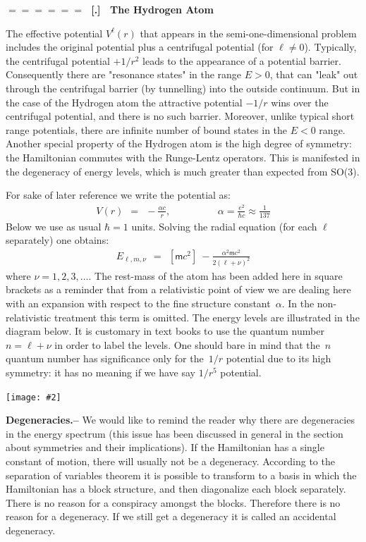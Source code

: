 \documentclass[onecolumn,fleqn]{revtex4}
\newcommand{\mass}{\mathsf{m}}
\newcommand{\putgraph}[2][0.30\hsize]{\texttt{[image: \#2]}}
\newcommand{\beq}{\begin{eqnarray}}
\newcommand{\eeq}{\end{eqnarray}}
\renewcommand{\thesubsection}{\arabic{subsection}}
\renewcommand{\thesubsubsection}{\arabic{subsubsection}}
\newcommand{\sheadC}[1]
{
\addtocounter{subsubsection}{1}
\vspace{5mm}
{\Large\bf $=\!=\!=\!=\!=\!=\;$ [\thesubsection.\thesubsubsection] \ #1}  
\nopagebreak
\phantomsection
}
\begin{document}
\sheadC{The Hydrogen Atom} 


The effective potential ${V^{\ell}(r)}$ that appears 
in the semi-one-dimensional problem includes the 
original potential plus a centrifugal potential 
(for ${\ell \ne 0}$). Typically, the centrifugal 
potential ${ +{1}/{r^2} }$ leads to the appearance 
of a potential barrier. 
Consequently there are "resonance states" 
in the range ${E>0}$, that can "leak" out through 
the centrifugal barrier (by tunnelling) 
into the outside continuum.
But in the case of the Hydrogen atom the attractive 
potential ${-{1}/{r}}$ wins over the centrifugal potential, 
and there is no such barrier. 
Moreover, unlike typical short range potentials, 
there are infinite number of bound states in the ${E<0}$ range. 
Another special property of the Hydrogen 
atom is the high degree of symmetry: the Hamiltonian commutes 
with the Runge-Lentz operators. This is manifested in the 
degeneracy of energy levels, which is much greater 
than expected from SO(3).

For sake of later reference we write the potential as:
\beq
V(r) \ \ = \ \ -\frac{\alpha c}{r}, \hspace{2cm} \alpha=\frac{e^2}{\hbar c} \approx  \frac{1}{137}
\eeq
Below we use as usual ${\hbar=1}$ units. 
Solving the radial equation (for each ${\ell}$ separately) one obtains:
\beq
E_{\ell ,m, \nu} \ \ = \ \ [\mass c^2] \ - \frac{\alpha^2 \mass c^2}{2(\ell+\nu)^2} 
\eeq
where ${ \nu = 1,2,3, \dots  }$.
The rest-mass of the atom has been added here in square brackets 
as a reminder that from a relativistic point of view we are dealing 
here with an expansion with respect to the fine structure constant~$\alpha$.
In the non-relativistic treatment this term is omitted. 
The energy levels are illustrated in the diagram below.
It is customary in text books to use the quantum number ${n=\ell+\nu}$ 
in order to label the levels. One should bare in mind that the~$n$  
quantum number has significance only for the~$1/r$ potential 
due to its high symmetry: it has no meaning if we have say ${1/r^5}$ potential.

\begin{center}
\putgraph[0.45\hsize]{HydrogenEnergyLevels} 
\end{center}



{\bf Degeneracies.-- }
We would like to remind the reader 
why there are degeneracies in the energy spectrum 
(this issue has been discussed in general in the section 
about symmetries and their implications).  
If the Hamiltonian has a single constant 
of motion, there will usually not be a degeneracy. 
According to the separation of variables theorem 
it is possible to transform to a basis in which 
the Hamiltonian has a block structure, 
and then diagonalize each block separately. 
There is no reason for a conspiracy amongst the 
blocks. Therefore there is no reason for a degeneracy. 
If we still get a degeneracy it is 
called an accidental degeneracy.  
\end{document}

